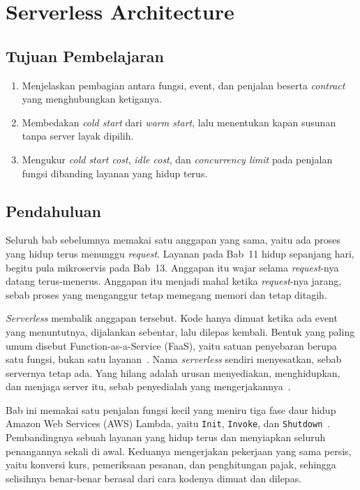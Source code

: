 \chapter{Serverless Architecture}
\label{bab:serverless}

\section*{Tujuan Pembelajaran}

\begin{enumerate}
  \item Menjelaskan pembagian antara fungsi, event, dan penjalan beserta
    \textit{contract} yang menghubungkan ketiganya.
  \item Membedakan \textit{cold start} dari \textit{warm start}, lalu
    menentukan kapan susunan tanpa server layak dipilih.
  \item Mengukur \textit{cold start cost}, \textit{idle cost}, dan
    \textit{concurrency limit} pada penjalan fungsi dibanding layanan yang
    hidup terus.
\end{enumerate}

\section{Pendahuluan}

Seluruh bab sebelumnya memakai satu anggapan yang sama, yaitu ada proses yang
hidup terus menunggu \textit{request}. Layanan pada Bab~11 hidup sepanjang hari,
begitu pula mikroservis pada Bab~13. Anggapan itu wajar selama
\textit{request}-nya
datang terus-menerus. Anggapan itu menjadi mahal ketika \textit{request}-nya jarang,
sebab proses yang menganggur tetap memegang memori dan tetap ditagih.

\textit{Serverless} membalik anggapan tersebut.
Kode hanya dimuat ketika ada
event yang menuntutnya, dijalankan sebentar, lalu dilepas kembali. Bentuk yang
paling umum disebut Function-as-a-Service (FaaS), yaitu satuan penyebaran
berupa satu fungsi, bukan satu layanan~\cite{jonas2019berkeley}. Nama
\textit{serverless} sendiri menyesatkan, sebab servernya tetap ada. Yang hilang
adalah urusan menyediakan, menghidupkan, dan menjaga server itu, sebab
penyedialah yang mengerjakannya~\cite{cncf2018serverless}.

Bab ini memakai satu penjalan fungsi kecil yang meniru tiga fase daur hidup
Amazon Web Services (AWS) Lambda, yaitu \texttt{Init}, \texttt{Invoke}, dan
\texttt{Shutdown}~\cite{aws2026lambda}. Pembandingnya sebuah layanan yang hidup
terus dan menyiapkan seluruh penangannya sekali di awal. Keduanya mengerjakan
pekerjaan yang sama persis, yaitu konversi kurs, pemeriksaan pesanan, dan
penghitungan pajak, sehingga selisihnya benar-benar berasal dari cara kodenya
dimuat dan dilepas.

